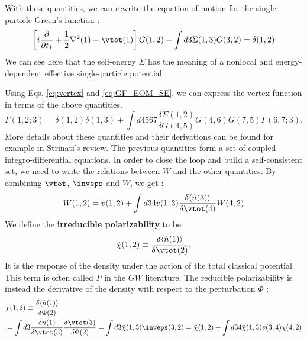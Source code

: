 With these quantities, we can rewrite the equation of motion for the single-particle Green's function :
\begin{equation}
	\left[ i \frac{\partial}{\partial t_1} + \frac{1}{2}\nabla^2(1) - \vtot (1)\right] G(1,2) - \int d3 \Sigma(1,3) G(3,2) = \delta(1,2) \label{eq:GF_EOM_SE}
\end{equation}
We can see here that the self-energy $\Sigma$ has the meaning of a nonlocal and energy-dependent effective single-particle potential.
%

Using Eqs. \eqref{eq:vertex} and \eqref{eq:GF_EOM_SE}, we can express the vertex function in terms of the above quantities. 
\begin{equation}
	\Gamma(1,2;3) = \delta(1,2) \delta(1,3) + \int d4567 \frac{\delta \Sigma(1,2)}{\delta G(4,5)} G(4,6) G(7,5) \Gamma(6,7;3). \label{eq:vertex_hedin}
\end{equation}
More details about these quantities and their derivations can be found for example in Strinati's review. \cite{strinati1988application}
The previous quantities form a set of coupled integro-differential equations. In order to close the loop and build a self-consistent set, we need to write the relations between $W$ and the other quantities. By combining $\vtot$, $\inveps$ and $W$, we get :
\begin{equation}
	W(1,2) = v(1,2) + \int d34 v(1,3) \frac{\delta \langle \hat{n}(3)\rangle}{\delta \vtot (4)} W(4,2)
\end{equation}
We define the \textbf{irreducible polarizability} to be :
\begin{equation}
	\tilde{\chi}(1,2) \equiv \frac{\delta \langle \hat{n}(1)\rangle}{\delta \vtot (2)}. \label{eq:P_dn/dV}
\end{equation}
It is the response of the density under the action of the total classical potential. This term is often called $P$ in the $GW$ literature. The reducible polarizability is instead the derivative of the density with respect to the perturbation $\Phi$ :
\begin{align}
	&\chi(1,2) \equiv \frac{\delta \langle \hat{n}(1)\rangle}{\delta \Phi (2)}\\
	 &= \int d3 \frac{\delta n(1)}{\delta \vtot(3)} \frac{\delta \vtot(3)}{\delta \Phi (2)} = \int d3 \tilde{\chi}(1,3)\inveps(3,2) = \tilde{\chi}(1,2) + \int d34 \tilde{\chi}(1,3) v(3,4) \chi(4,2) \label{eq:chi_dn/dPhi}
\end{align}

